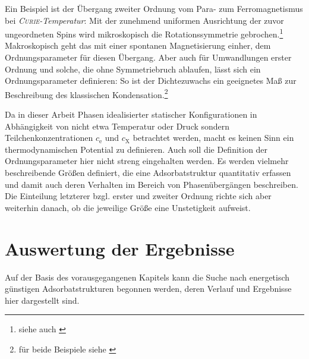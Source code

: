 \documentclass[a4paper, 10pt, twoside, openany]{book} %
\def \cE {c_\mathrm{e}}
\def \cX {c_\mathrm{X}}
\begin{document}
Ein Beispiel ist der Übergang zweiter Ordnung vom Para- zum Ferromagnetismus bei \emph{\textsc{Curie}-Temperatur}: Mit der zunehmend uniformen Ausrichtung der zuvor ungeordneten Spins wird mikroskopisch die Rotationssymmetrie gebrochen.\footnote{siehe auch \cite[S.~3]{Sethna}} Makroskopisch geht das mit einer spontanen Magnetisierung einher, dem Ordnungsparameter für diesen Übergang. Aber auch für Umwandlungen erster Ordnung und solche, die ohne Symmetriebruch ablaufen, lässt sich ein Ordnungsparameter definieren: So ist der Dichtezuwachs ein geeignetes Maß zur Beschreibung des klassischen Kondensation.\footnote{für beide Beispiele siehe \cite[S.~324 bzw. 314]{Fliessbach}}

Da in dieser Arbeit Phasen idealisierter statischer Konfigurationen in Abhängigkeit von nicht etwa Temperatur oder Druck sondern Teilchenkonzentrationen $\cE$ und $\cX$ betrachtet werden, macht es keinen Sinn ein thermodynamischen Potential zu definieren. Auch soll die Definition der Ordnungsparameter hier nicht streng eingehalten werden. Es werden vielmehr beschreibende Größen definiert, die eine Adsorbatstruktur quantitativ erfassen und damit auch deren Verhalten im Bereich von Phasenübergängen beschreiben. Die Einteilung letzterer bzgl. erster und zweiter Ordnung richte sich aber weiterhin danach, ob die jeweilige Größe eine Unstetigkeit aufweist.

\chapter{Auswertung der Ergebnisse}
\label{Ergebnisse}

Auf der Basis des vorausgegangenen Kapitels kann die Suche nach energetisch günstigen Adsorbatstrukturen begonnen werden, deren Verlauf und Ergebnisse hier dargestellt sind.
\end{document}
